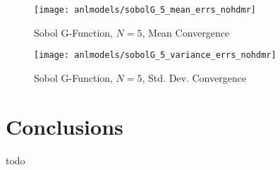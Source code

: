 \begin{figure}[H]
  \centering
  \texttt{[image: anlmodels/sobolG\_5\_mean\_errs\_nohdmr]}
  \caption{Sobol G-Function, $N=5$, Mean Convergence}
  \label{fig:sobolG mean errors 5}
\end{figure}
\begin{figure}[H]
  \centering
  \texttt{[image: anlmodels/sobolG\_5\_variance\_errs\_nohdmr]}
  \caption{Sobol G-Function, $N=5$, Std. Dev. Convergence}
  \label{fig:sobolG var errors 5}
\end{figure}




\section{Conclusions}
todo
